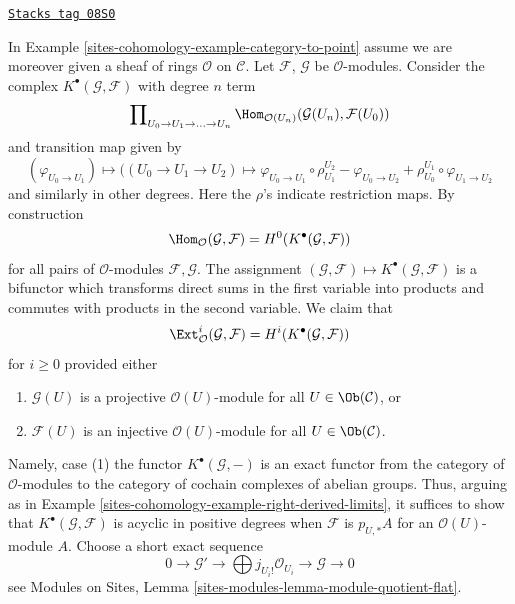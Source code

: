 \begin{example}

\label{sites-cohomology-example-computing-exts}
\href{https://stacks.math.columbia.edu/tag/08S0}{\texttt{Stacks tag 08S0}}

In Example \ref{sites-cohomology-example-category-to-point} assume we are moreover given
a sheaf of rings $\mathcal{O}$ on $\mathcal{C}$. Let
$\mathcal{F}$, $\mathcal{G}$ be $\mathcal{O}$-modules.
Consider the complex $K^\bullet(\mathcal{G}, \mathcal{F})$
with degree $n$ term
$$
\prod\nolimits_{U_0 \to U_1 \to \ldots \to U_n}
\Hom_{\mathcal{O}(U_n)}(\mathcal{G}(U_n), \mathcal{F}(U_0))
$$
and transition map given by
$$
(\varphi_{U_0 \to U_1})
\longmapsto
((U_0 \to U_1 \to U_2) \mapsto
\varphi_{U_0 \to U_1} \circ \rho^{U_2}_{U_1}
- \varphi_{U_0 \to U_2}
+ \rho^{U_1}_{U_0} \circ \varphi_{U_1 \to U_2}
$$
and similarly in other degrees. Here the $\rho$'s indicate restriction maps.
By construction
$$
\Hom_\mathcal{O}(\mathcal{G}, \mathcal{F}) =
H^0(K^\bullet(\mathcal{G}, \mathcal{F}))
$$
for all pairs of $\mathcal{O}$-modules $\mathcal{F}, \mathcal{G}$.
The assignment
$(\mathcal{G}, \mathcal{F}) \mapsto K^\bullet(\mathcal{G}, \mathcal{F})$
is a bifunctor which transforms direct sums in the first variable into
products and commutes with products in the second variable.
We claim that
$$
\Ext^i_\mathcal{O}(\mathcal{G}, \mathcal{F}) =
H^i(K^\bullet(\mathcal{G}, \mathcal{F}))
$$
for $i \geq 0$ provided either
\begin{enumerate}
\item $\mathcal{G}(U)$ is a projective $\mathcal{O}(U)$-module
for all $U \in \Ob(\mathcal{C})$, or
\item $\mathcal{F}(U)$ is an injective $\mathcal{O}(U)$-module
for all $U \in \Ob(\mathcal{C})$.
\end{enumerate}
Namely, case (1) the functor $K^\bullet(\mathcal{G}, -)$
is an exact functor from the category of $\mathcal{O}$-modules
to the category of cochain complexes of abelian groups.
Thus, arguing as in Example \ref{sites-cohomology-example-right-derived-limits},
it suffices to show that $K^\bullet(\mathcal{G}, \mathcal{F})$
is acyclic in positive degrees when $\mathcal{F}$ is $p_{U, *}A$
for an $\mathcal{O}(U)$-module $A$.
Choose a short exact sequence
\begin{equation}
\label{equation-split}
0 \to \mathcal{G}' \to \bigoplus j_{U_i!}\mathcal{O}_{U_i} \to
\mathcal{G} \to 0
\end{equation}
see Modules on Sites, Lemma \ref{sites-modules-lemma-module-quotient-flat}.

\end{example}
